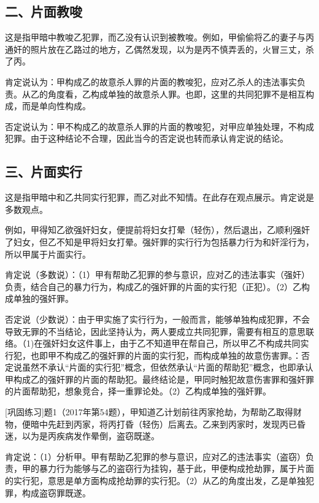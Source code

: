 \subsection*{二、片面教唆}

这是指甲暗中教唆乙犯罪，而乙没有认识到被教唆。例如，甲偷偷将乙的妻子与丙通奸的照片放在乙路过的地方，乙偶然发现，以为是丙不慎弄丢的，火冒三丈，杀了丙。

肯定说认为：甲构成乙的故意杀人罪的片面的教唆犯，应对乙杀人的违法事实负责。从乙的角度看，乙构成单独的故意杀人罪。也即，这里的共同犯罪不是相互构成，而是单向性构成。

否定说认为：甲不构成乙的故意杀人罪的片面的教唆犯，对甲应单独处理，不构成犯罪。由于这种结论不合理，因此当今的否定说也转而承认肯定说的结论。

\subsection*{三、片面实行}

这是指甲暗中和乙共同实行犯罪，而乙对此不知情。在此存在观点展示。肯定说是多数观点。

例如，甲得知乙欲强奸妇女，便提前将妇女打晕（轻伤），然后退出，乙顺利强奸了妇女，但乙不知是甲将妇女打晕。强奸罪的实行行为包括暴力行为和奸淫行为，所以甲属于片面实行。

肯定说（多数说）：（1）甲有帮助乙犯罪的参与意识，应对乙的违法事实（强奸）负责，结合自己的暴力行为，构成乙的强奸罪的片面的实行犯（正犯）。（2）乙构成单独的强奸罪。

否定说（少数说）：由于甲实施了实行行为，一般而言，能够单独构成犯罪，不会导致无罪的不当结论，因此坚持认为，两人要成立共同犯罪，需要有相互的意思联络。（1)在强奸妇女这件事上，由于乙不知道甲在帮自己，所以甲乙不构成共同实行犯，也即甲不构成乙的强奸罪的片面的实行犯，而构成单独的故意伤害罪。：否定说虽然不承认“片面的实行犯”概念，但依然承认“片面的帮助犯”概念，也即承认甲构成乙的强奸罪的片面的帮助犯。最终结论是，甲同时触犯故意伤害罪和强奸罪的片面帮助犯，想象竞合，择一重罪论处。（2）乙构成单独的强奸罪。

[巩固练习]题1（2017年第54题），甲知道乙计划前往丙家抢劫，为帮助乙取得财物，便暗中先赶到丙家，将丙打昏（轻伤）后离去。乙来到丙家时，发现丙已昏迷，以为是丙疾病发作晕倒，盗窃既遂。

肯定说：（1）分析甲。甲有帮助乙犯罪的参与意识，应对乙的违法事实（盗窃）负责，甲的暴力行为能够与乙的盗窃行为挂钩，基于此，甲便构成抢劫罪，属于片面的实行犯，意思是单方面构成抢劫罪的实行犯。（2）从乙的角度出发，乙是单独犯罪，构成盗窃罪既遂。

